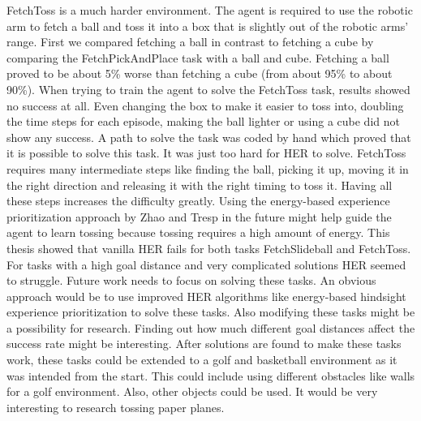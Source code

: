 \newline
FetchToss is a much harder environment. The agent is required to use the robotic arm to fetch a ball and toss it into a box that is slightly out of the robotic arms' range. First we compared fetching a ball in contrast to fetching a cube by comparing the FetchPickAndPlace task with a ball and cube. Fetching a ball proved to be about 5\% worse than fetching a cube (from about 95\% to about 90\%). When trying to train the agent to solve the FetchToss task, results showed no success at all. Even changing the box to make it easier to toss into, doubling the time steps for each episode, making the ball lighter or using a cube did not show any success. A path to solve the task was coded by hand which proved that it is possible to solve this task. It was just too hard for HER to solve. FetchToss requires many intermediate steps like finding the ball, picking it up, moving it in the right direction and releasing it with the right timing to toss it. Having all these steps increases the difficulty greatly. Using the energy-based experience prioritization approach by Zhao and Tresp \cite{energyher} in the future might help guide the agent to learn tossing because tossing requires a high amount of energy. 
\newline
This thesis showed that vanilla HER fails for both tasks FetchSlideball and FetchToss. For tasks with a high goal distance and very complicated solutions HER seemed to struggle.
Future work needs to focus on solving these tasks. An obvious approach would be to use improved HER algorithms like energy-based hindsight experience prioritization to solve these tasks. Also modifying these tasks might be a possibility for research. Finding out how much different goal distances affect the success rate might be interesting. After solutions are found to make these tasks work, these tasks could be extended to a golf and basketball environment as it was intended from the start. This could include using different obstacles like walls for a golf environment. Also, other objects could be used. It would be very interesting to research tossing paper planes.   
 
 
 
 